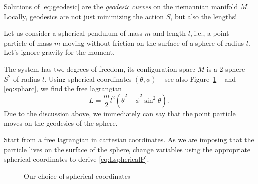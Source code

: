 \documentclass[english,fontsize=11pt,paper=a5,oneside]{scrbook}
\theoremstyle{definition}
\newenvironment{example}
  {\pushQED{\qed}\renewcommand{\qedsymbol}{$\lozenge$}\examplex}
  {\popQED\endexamplex}
\newenvironment{exercise}
  {\pushQED{\qed}\renewcommand{\qedsymbol}{$\maltese$}\exercisex}
  {\popQED\endexercisex}
\begin{document}
Solutions of \eqref{eq:geodesic} are the \emph{geodesic curves} on the riemannian manifold $M$. Locally, geodesics are not just minimizing the action $S$, but also the lengths!

\begin{example}\label{ex:sphericalP}
  Let us consider a spherical pendulum of mass $m$ and length $l$, i.e., a point particle of mass $m$ moving without friction on the surface of a sphere of radius $l$.
  Let's ignore gravity for the moment.

  The system has two degrees of freedom, its configuration space $M$ is a 2-sphere $S^2$ of radius $l$.
  Using spherical coordinates $(\theta, \phi)$ -- see also Figure~\ref{fig:sphcoords} -- and \eqref{eq:spharc}, we find the free lagrangian
  \begin{equation}\label{eq:LsphericalP}
    L = \frac m2 l^2(\dot \theta^2 + \dot \phi^2 \sin^2\theta).
  \end{equation}
  Due to the discussion above, we immediately can say that the point particle moves on the geodesics of the sphere.
\end{example}

\begin{exercise}
  Start from a free lagrangian in cartesian coordinates.
  As we are imposing that the particle lives on the surface of the sphere, change variables using the appropriate spherical coordinates to derive \eqref{eq:LsphericalP}.
\end{exercise}

\begin{figure}[ht]
  \centering
  \caption{Our choice of spherical coordinates}
  \label{fig:sphcoords}
\end{figure}
\end{document}
